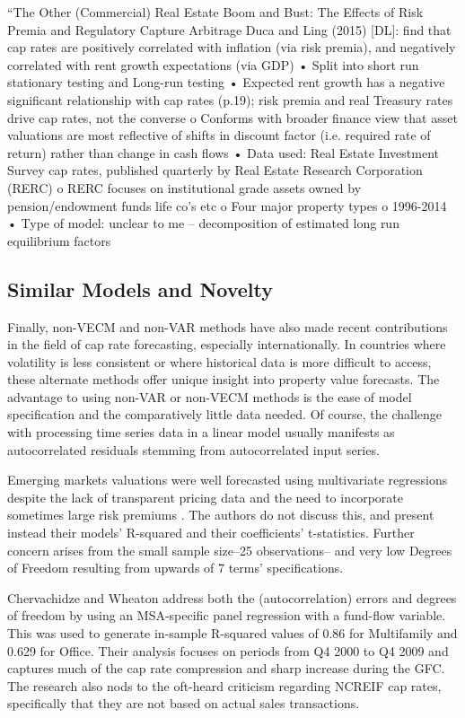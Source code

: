 “The Other (Commercial) Real Estate Boom and Bust: The Effects of Risk Premia and Regulatory Capture Arbitrage
Duca and Ling (2015) [DL]: find that cap rates are positively correlated with inflation (via risk premia), and negatively correlated with rent growth expectations (via GDP)
•	Split into short run stationary testing and Long-run testing
•	Expected rent growth has a negative significant relationship with cap rates (p.19); risk premia and real Treasury rates drive cap rates, not the converse
o	Conforms with broader finance view that asset valuations are most reflective of shifts in discount factor (i.e. required rate of return) rather than change in cash flows
•	Data used: Real Estate Investment Survey cap rates, published quarterly by Real Estate Research Corporation (RERC)
o	RERC focuses on institutional grade assets owned by pension/endowment funds life co’s etc
o	Four major property types
o	1996-2014
•	Type of model: unclear to me – decomposition of estimated long run equilibrium factors

\subsection{Similar Models and Novelty}
Finally, non-VECM and non-VAR methods have also made recent contributions in the field of cap rate forecasting, especially internationally. In countries where volatility is less consistent or where historical data is more difficult to access, these alternate methods offer unique insight into property value forecasts. The advantage to using non-VAR or non-VECM methods is the ease of model specification and the comparatively little data needed. Of course, the challenge with processing time series data in a linear model usually manifests as autocorrelated residuals stemming from autocorrelated input series. 

Emerging markets valuations were well forecasted using multivariate regressions despite the lack of transparent pricing data and the need to incorporate sometimes large risk premiums \citep*{dasgupta2008forecasting}. The authors do not discuss this, and present instead their models' R-squared and their coefficients' t-statistics. Further concern arises from the small sample size--25 observations-- and very low Degrees of Freedom resulting from upwards of 7 terms' specifications. 

Chervachidze and Wheaton \citep*{chervachidze2013determined} address both the (autocorrelation) errors and degrees of freedom by using an MSA-specific panel regression with a fund-flow variable. This was used to generate in-sample R-squared values of 0.86 for Multifamily and 0.629 for Office. Their analysis focuses on periods from Q4 2000 to Q4 2009 and captures much of the cap rate compression and sharp increase during the GFC. The research also nods to the oft-heard criticism regarding NCREIF cap rates, specifically that they are not based on actual sales transactions. 




